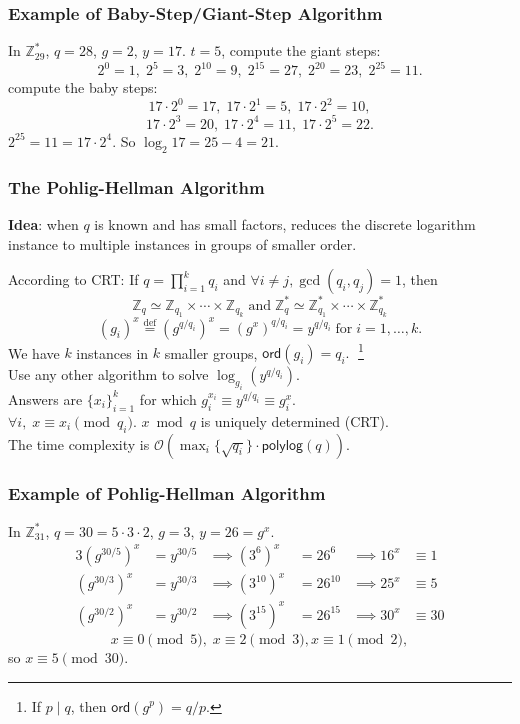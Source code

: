 \begin{frame}\frametitle{Example of Baby-Step/Giant-Step Algorithm}
\begin{exampleblock}{In $\mathbb{Z}^*_{29}$, $q=28$, $g=2$, $y=17$.}
$t=5$, compute the giant steps:
\[2^0=1,\; 2^5=3,\; 2^{10}=9,\; 2^{15}=27,\; 2^{20}=23,\; 2^{25}=11. \]
compute the baby steps:
\[17\cdot 2^0=17,\; 17\cdot 2^1=5,\; 17\cdot 2^2=10,\]
\[ 17\cdot 2^3=20,\; 17\cdot 2^4=11,\; 17\cdot 2^5=22.\]
$2^{25}=11=17\cdot 2^4$. So $\log_2 17=25-4=21$.
\end{exampleblock}

\end{frame}
\begin{frame}\frametitle{The Pohlig-Hellman Algorithm}
\textbf{Idea}: when $q$ is known and has small factors, reduces the discrete logarithm instance to multiple instances in groups of smaller order.
\newline

According to CRT: If $q=\prod^k_{i=1}q_i$ and $\forall i\neq j, \gcd(q_i,q_j)=1$, then
\[ \mathbb{Z}_q \simeq \mathbb{Z}_{q_1} \times \cdots \times \mathbb{Z}_{q_k}\; \text{and}\; \mathbb{Z}^*_q \simeq \mathbb{Z}^*_{q_1} \times \cdots \times \mathbb{Z}^*_{q_k} \]
\[(g_i)^x\overset{\text{def}}{=} \left( g^{q/q_i} \right)^x = (g^x)^{q/q_i} = y^{q/q_i}\; \text{for}\; i=1,\dotsc,k.\]
We have $k$ instances in $k$ smaller groups, $\mathsf{ord}(g_i) = q_i.\;$ \footnote{If $p \mid q$, then $\mathsf{ord}(g^p)=q/p$.}\\
Use any other algorithm to solve $\log_{g_i}  (y^{q/q_i})$.\\
Answers are $\{x_i\}^k_{i=1}$ for which $g_i^{x_i} \equiv y^{q/q_i} \equiv g_i^x$. \\
$\forall i,\;x \equiv x_i \pmod{q_i}$. $x \bmod q$ is uniquely determined (CRT). \\
The time complexity is $\mathcal{O}(\max_i\{\sqrt{q_i}\}\cdot \mathsf{polylog}(q))$.
\end{frame}
\begin{frame}\frametitle{Example of Pohlig-Hellman Algorithm}
\begin{exampleblock}{In $\mathbb{Z}^*_{31}$, $q=30=5\cdot 3 \cdot 2$, $g=3$, $y=26=g^x$.}
\begin{alignat*}{3}
(g^{30/5})^x & = y^{30/5} & \implies (3^{6})^x\;\, & = 26^{6} & \implies 16^x & \equiv 1 \\
(g^{30/3})^x & = y^{30/3} & \implies (3^{10})^x & = 26^{10} & \implies 25^x & \equiv 5 \\
(g^{30/2})^x & = y^{30/2} & \implies (3^{15})^x & = 26^{15} & \implies 30^x & \equiv 30 
\end{alignat*}
\[ x \equiv 0 \pmod 5,\; x \equiv 2 \pmod 3, x \equiv 1 \pmod 2, \]
so $x \equiv 5 \pmod{30}$.
\end{exampleblock}
\end{frame}
